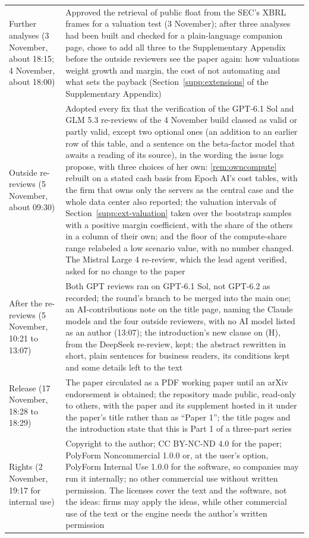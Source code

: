 {\begin{longtable}{@{}p{}p{}@{}}
Further analyses (3 November, about 18:15; 4 November, about 18:00) & Approved the retrieval of public float from the SEC's XBRL frames for a valuation test (3 November); after three analyses had been built and checked for a plain-language companion page, chose to add all three to the Supplementary Appendix before the outside reviewers see the paper again: how valuations weight growth and margin, the cost of not automating and what sets the payback (Section~\ref{supp:extensions} of the Supplementary Appendix)\\
Outside re-reviews (5 November, about 09:30) & Adopted every fix that the verification of the GPT-6.1 Sol and GLM 5.3 re-reviews of the 4 November build classed as valid or partly valid, except two optional ones (an addition to an earlier row of this table, and a sentence on the beta-factor model that awaits a reading of its source), in the wording the issue logs propose, with three choices of her own: \autoref{rem:owncompute} rebuilt on a stated cash basis from Epoch AI's cost tables, with the firm that owns only the servers as the central case and the whole data center also reported; the valuation intervals of Section~\ref{supp:ext-valuation} taken over the bootstrap samples with a positive margin coefficient, with the share of the others in a column of their own; and the floor of the compute-share range relabeled a low scenario value, with no number changed. The Mistral Large 4 re-review, which the lead agent verified, asked for no change to the paper\\
After the re-reviews (5 November, 10:21 to 13:07) & Both GPT reviews ran on GPT-6.1 Sol, not GPT-6.2 as recorded; the round's branch to be merged into the main one; an AI-contributions note on the title page, naming the Claude models and the four outside reviewers, with no AI model listed as an author (13:07); the introduction's new clause on (H), from the DeepSeek re-review, kept; the abstract rewritten in short, plain sentences for business readers, its conditions kept and some details left to the text\\
Release (17 November, 18:28 to 18:29) & The paper circulated as a PDF working paper until an arXiv endorsement is obtained; the repository made public, read-only to others, with the paper and its supplement hosted in it under the paper's title rather than as ``Paper 1''; the title pages and the introduction state that this is Part 1 of a three-part series\\
Rights (2 November, 19:17 for internal use) & Copyright to the author; CC BY-NC-ND 4.0 for the paper; PolyForm Noncommercial 1.0.0 or, at the user's option, PolyForm Internal Use 1.0.0 for the software, so companies may run it internally; no other commercial use without written permission. The licenses cover the text and the software, not the ideas: firms may apply the ideas, while other commercial use of the text or the engine needs the author's written permission\\
\end{longtable}
}
